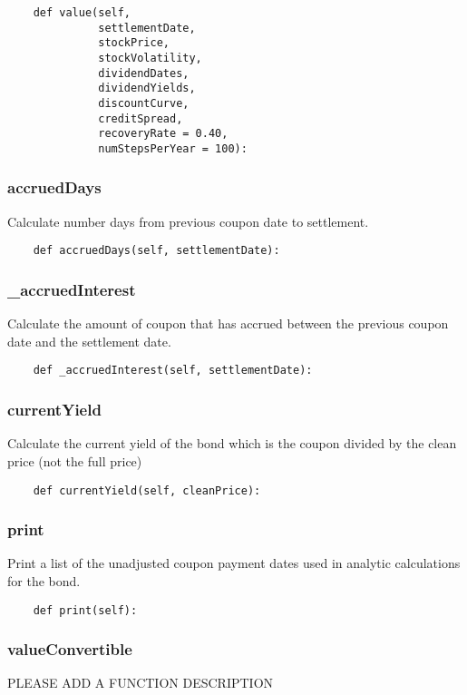 \documentclass[twoside,11pt]{book}
\begin{document}
\begin{lstlisting}
    def value(self,
              settlementDate,
              stockPrice,
              stockVolatility,
              dividendDates,
              dividendYields,
              discountCurve,
              creditSpread,
              recoveryRate = 0.40,
              numStepsPerYear = 100):
\end{lstlisting}

\subsubsection*{{\bf accruedDays}}
Calculate number days from previous coupon date to settlement. 

\begin{lstlisting}
    def accruedDays(self, settlementDate):
\end{lstlisting}

\subsubsection*{{\bf \_accruedInterest}}
Calculate the amount of coupon that has accrued between the previous coupon date and the settlement date.  

\begin{lstlisting}
    def _accruedInterest(self, settlementDate):
\end{lstlisting}

\subsubsection*{{\bf currentYield}}
Calculate the current yield of the bond which is the coupon divided by the clean price (not the full price) 

\begin{lstlisting}
    def currentYield(self, cleanPrice):
\end{lstlisting}

\subsubsection*{{\bf print}}
Print a list of the unadjusted coupon payment dates used in analytic calculations for the bond.  

\begin{lstlisting}
    def print(self):
\end{lstlisting}

\subsubsection*{{\bf valueConvertible}}
PLEASE ADD A FUNCTION DESCRIPTION
\end{document}
